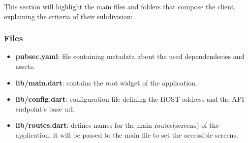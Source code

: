 This section will highlight the main files and folders that compose the client, explaining the criteria of their subdivision:
\subsubsection{Files}
\begin{itemize}
	\item \textbf{pubsec.yaml}: file containing metadata about the used dependendecies and assets.
	\item \textbf{lib/main.dart}: contains the root widget of the application.
	\item \textbf{lib/config.dart}: configuration file defining the HOST address and the API endpoint's base url.
	\item \textbf{lib/routes.dart}: defines names for the main routes(screens) of the application, it will be passed to the main file to set the accessible screens.
\end{itemize}

